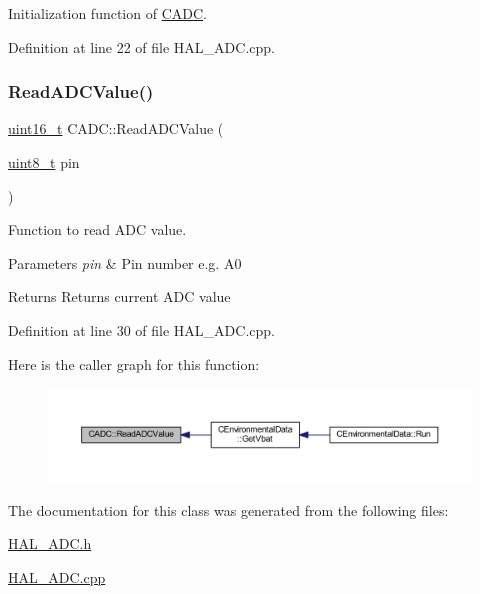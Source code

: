 Initialization function of \mbox{\hyperlink{class_c_a_d_c}{C\+A\+DC}}. 



Definition at line 22 of file H\+A\+L\+\_\+\+A\+D\+C.\+cpp.

\mbox{\label{class_c_a_d_c_ac2f897fc64f605751ac3ffe7d2704ba6}} 
\subsubsection{\texorpdfstring{Read\+A\+D\+C\+Value()}{ReadADCValue()}}
{\footnotesize\ttfamily \mbox{\hyperlink{_a_d_a_s___types_8h_a1f1825b69244eb3ad2c7165ddc99c956}{uint16\+\_\+t}} C\+A\+D\+C\+::\+Read\+A\+D\+C\+Value (\begin{DoxyParamCaption}\item[{\mbox{\hyperlink{_a_d_a_s___types_8h_aba7bc1797add20fe3efdf37ced1182c5}{uint8\+\_\+t}}}]{pin }\end{DoxyParamCaption})}



Function to read A\+DC value. 


\begin{DoxyParams}{Parameters}
{\em pin} & Pin number e.\+g. A0 \\
\hline
\end{DoxyParams}
\begin{DoxyReturn}{Returns}
Returns current A\+DC value 
\end{DoxyReturn}


Definition at line 30 of file H\+A\+L\+\_\+\+A\+D\+C.\+cpp.

Here is the caller graph for this function\+:\nopagebreak
\begin{figure}[H]
\begin{center}
\leavevmode
\includegraphics[width=350pt]{class_c_a_d_c_ac2f897fc64f605751ac3ffe7d2704ba6_icgraph}
\end{center}
\end{figure}


The documentation for this class was generated from the following files\+:\begin{DoxyCompactItemize}
\item 
\mbox{\hyperlink{_h_a_l___a_d_c_8h}{H\+A\+L\+\_\+\+A\+D\+C.\+h}}\item 
\mbox{\hyperlink{_h_a_l___a_d_c_8cpp}{H\+A\+L\+\_\+\+A\+D\+C.\+cpp}}\end{DoxyCompactItemize}
